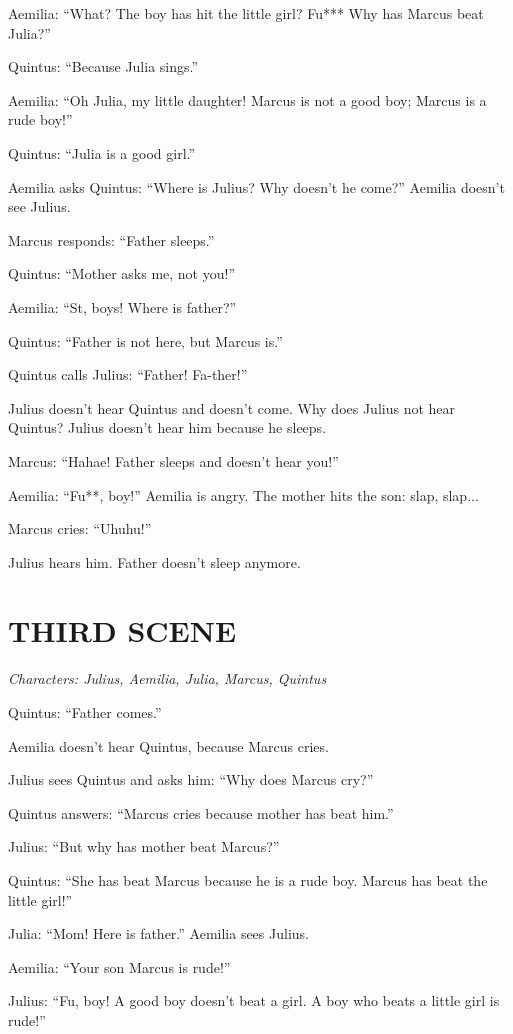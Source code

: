 Aemilia: ``What? The boy has hit the little girl? Fu*** Why has Marcus beat Julia?''

Quintus: ``Because Julia sings.''

Aemilia: ``Oh Julia, my little daughter! Marcus is not a good boy; Marcus is a rude boy!''

Quintus: ``Julia is a good girl.''

Aemilia asks Quintus: ``Where is Julius? Why doesn't he come?'' Aemilia doesn't see Julius.

Marcus responds: ``Father sleeps.''

Quintus: ``Mother asks me, not you!''

Aemilia: ``St, boys! Where is father?''

Quintus: ``Father is not here, but Marcus is.''

Quintus calls Julius: ``Father! Fa-ther!''

Julius doesn't hear Quintus and doesn't come. Why does Julius not hear Quintus? Julius doesn't hear him because he sleeps.

Marcus: ``Hahae! Father sleeps and doesn't hear you!''

Aemilia: ``Fu**, boy!'' Aemilia is angry. The mother hits the son: slap, slap...

Marcus cries: ``Uhuhu!''

Julius hears him. Father doesn't sleep anymore.

\section[Third scene]{THIRD SCENE}
\emph{Characters: Julius, Aemilia, Julia, Marcus, Quintus}

Quintus: ``Father comes.''

Aemilia doesn't hear Quintus, because Marcus cries.

Julius sees Quintus and asks him: ``Why does Marcus cry?''

Quintus answers: ``Marcus cries because mother has beat him.''

Julius: ``But why has mother beat Marcus?''

Quintus: ``She has beat Marcus because he is a rude boy. Marcus has beat the little girl!''

Julia: ``Mom! Here is father.'' Aemilia sees Julius.

Aemilia: ``Your son Marcus is rude!''

Julius: ``Fu, boy! A good boy doesn't beat a girl. A boy who beats a little girl is rude!''

